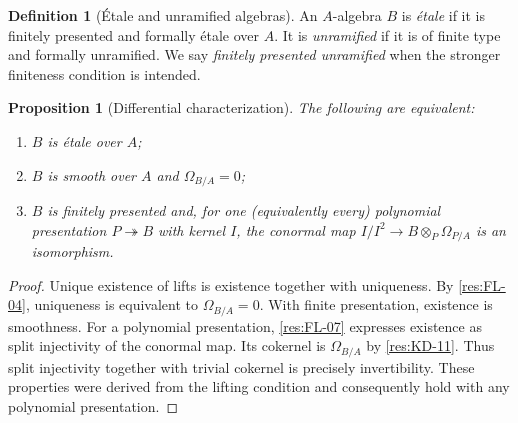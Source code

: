 \documentclass[11pt,oneside,openany]{book}
\newtheorem{proposition}[theorem]{Proposition}
\theoremstyle{definition}
\newtheorem{definition}[theorem]{Definition}
\theoremstyle{remark}
\begin{document}
\begin{definition}[\'Etale and unramified algebras]\label{res:ET-01}
An $A$-algebra $B$ is \emph{\'etale} if it is finitely presented and
formally \'{e}tale over $A$. It is \emph{unramified} if it is of finite
type and formally unramified. We say \emph{finitely presented unramified}
when the stronger finiteness condition is intended.
\end{definition}

\begin{proposition}[Differential characterization]\label{res:ET-02}
The following are equivalent:
\begin{enumerate}
\item $B$ is \'{e}tale over $A$;
\item $B$ is smooth over $A$ and $\Omega_{B/A}=0$;
\item $B$ is finitely presented and, for one (equivalently every)
      polynomial presentation $P\twoheadrightarrow B$ with kernel $I$,
      the conormal map
      $I/I^2\to B\otimes_P\Omega_{P/A}$ is an isomorphism.
\end{enumerate}
\end{proposition}
\begin{proof}
Unique existence of lifts is existence together with uniqueness.
By \ref{res:FL-04}, uniqueness is equivalent to $\Omega_{B/A}=0$.
With finite presentation, existence is smoothness. For a polynomial
presentation, \ref{res:FL-07} expresses existence as split injectivity
of the conormal map. Its cokernel is $\Omega_{B/A}$ by \ref{res:KD-11}.
Thus split injectivity together with trivial cokernel is precisely
invertibility. These properties were derived from the lifting condition
and consequently hold with any polynomial presentation.
\end{proof}
\end{document}
